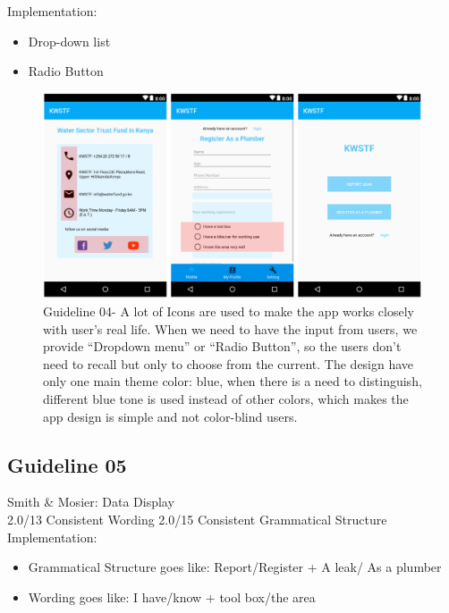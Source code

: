 \documentclass{article}
\begin{document}
\noindent
Implementation:
\begin{itemize}
\item Drop-down list
\item Radio Button
\end{itemize}

\begin{figure}[H]
\centering
\includegraphics[width=15cm]{files/figures/fig1_guide4.png}
\caption{Guideline 04- A lot of Icons are used to make the app works closely with user’s real life. When we need to have the input from users, we
provide “Dropdown menu” or “Radio Button”, so the users don’t need to recall but only to choose from the current. The
design have only one main theme color: blue, when there is a need to distinguish, different blue tone is used instead of
other colors, which makes the app design is simple and not color-blind users.}\nocite{*}

\end{figure} 



\subsection{Guideline 05}
Smith \& Mosier: Data Display\\
2.0/13 Consistent Wording 2.0/15 Consistent Grammatical Structure
\noindent
Implementation:
\begin{itemize}
\item Grammatical Structure goes like: Report/Register + A leak/ As a plumber
\item Wording goes like: I have/know + tool box/the area
\end{itemize}
\end{document}
